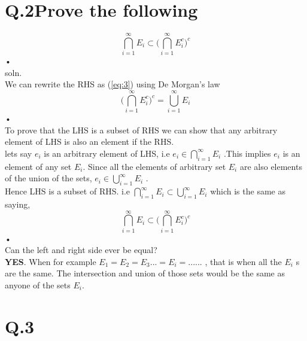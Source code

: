 \documentclass[a4paper,11pt]{article}
\begin{document}
\section*{Q.2\quad Prove the following}

\begin{equation}
\bigcap\limits_{i=1}^{\infty}E_{i} \subset\Bigg(\bigcap\limits_{i=1}^{\infty}E_{i}^c\Bigg)^c 
\end{equation}•\\
soln.\\
We can rewrite the RHS as (\ref{eq:3}) using De Morgan's law\\
\begin{equation}\label{eq:3}
\Bigg(\bigcap\limits_{i=1}^{\infty}E_{i}^c\Bigg)^c = \bigcup\limits_{i=1}^{\infty}E_{i} 
\end{equation}•\\
To prove that the LHS is a subset of RHS we can show that any arbitrary element of LHS is also an element if the RHS.\\
lets say $e_{i}$ is an arbitrary element of LHS,  i.e $e_{i} \in \bigcap\limits_{i=1}^{\infty}E_{i} $ .This implies 
$e_{i}$ is an element of any set $E_{i}$. Since all the elements of arbitrary set $E_{i}$ are also  elements of the union of the sets, $e_{i} \in \bigcup\limits_{i=1}^{\infty}E_{i}$ .\\
Hence LHS is a subset of RHS. i.e $\bigcap\limits_{i=1}^{\infty}E_{i} \subset  \bigcup\limits_{i=1}^{\infty}E_{i} $
which is the same as saying,\\
\begin{equation}
\bigcap\limits_{i=1}^{\infty}E_{i} \subset\Bigg(\bigcap\limits_{i=1}^{\infty}E_{i}^c\Bigg)^c 
\end{equation}•\\
 Can the left and right side ever be equal?\\
 \textbf{YES}. When for example $E_{1}=E_{2}=E_{3}...=E_{i}=......$ , that is when all the $E_{i}$ s are the same.
 The intersection and union of those sets would be the same as  anyone of the sets $E_{i}$.
\newpage
\section*{Q.3\quad }
\end{document}
